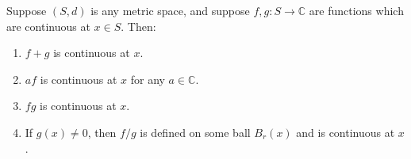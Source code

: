 Suppose $(S, d)$ is any metric space, and suppose $f, g: S \to \mathbb{C}$ are functions which are continuous at $x \in S$. Then:

\begin{enumerate}
\item $f + g$ is continuous at $x$.
\item $af$ is continuous at $x$ for any $a \in \mathbb{C}$.
\item $fg$ is continuous at $x$.
\item If $g(x) \neq 0$, then $f/g$ is defined on some ball $B_r(x)$ and is continuous at $x$.
\end{enumerate}
